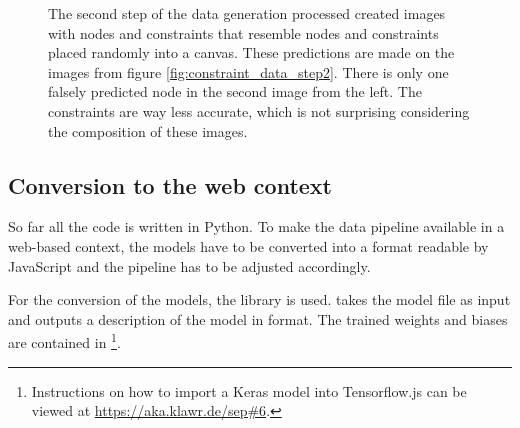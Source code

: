 \begin{figure}
\begin{subfigure}[b]{0.19\textwidth}
    \end{subfigure}
    \begin{subfigure}[b]{0.19\textwidth}
    \end{subfigure}
    \caption[Predictions of the first prototype on the generated data]{The second step of the data generation processed created images with nodes and constraints that resemble nodes and constraints placed randomly into a canvas. These predictions are made on the images from figure \ref{fig:constraint_data_step2}. There is only one falsely predicted node in the second image from the left. The constraints are way less accurate, which is not surprising considering the composition of these images.}
    \label{fig:constraint_data_step3}
\end{figure}

\subsection{Conversion to the web context} \label{ch:conversion_to_web_context}

So far all the code is written in Python.
To make the data pipeline available in a web-based context, the models have to be converted into a format readable by JavaScript and the pipeline has to be adjusted accordingly.

For the conversion of the models, the library  %
is used.
 takes the model file as input and outputs a description of the model in  format.
The trained weights and biases are contained in \footnote{Instructions on how to import a Keras model into Tensorflow.js can be viewed at \url{https://aka.klawr.de/sep\#6}.}. %

